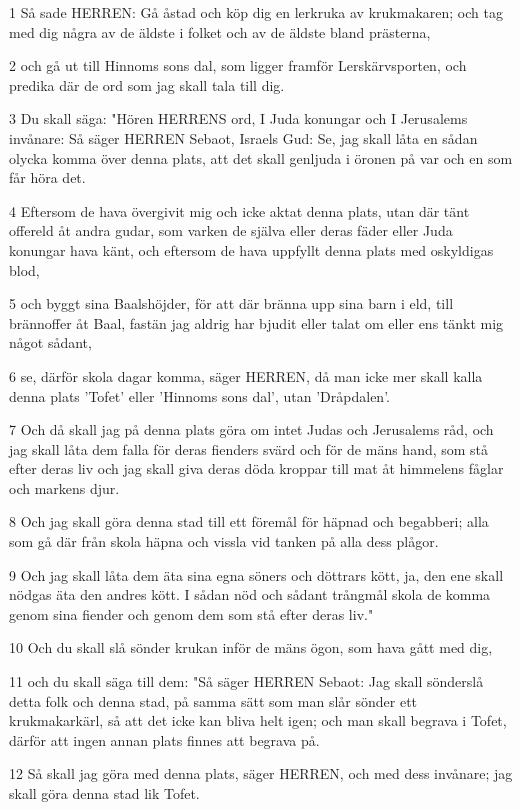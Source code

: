 \par 1 Så sade HERREN: Gå åstad och köp dig en lerkruka av krukmakaren; och tag med dig några av de äldste i folket och av de äldste bland prästerna,
\par 2 och gå ut till Hinnoms sons dal, som ligger framför Lerskärvsporten, och predika där de ord som jag skall tala till dig.
\par 3 Du skall säga: "Hören HERRENS ord, I Juda konungar och I Jerusalems invånare: Så säger HERREN Sebaot, Israels Gud: Se, jag skall låta en sådan olycka komma över denna plats, att det skall genljuda i öronen på var och en som får höra det.
\par 4 Eftersom de hava övergivit mig och icke aktat denna plats, utan där tänt offereld åt andra gudar, som varken de själva eller deras fäder eller Juda konungar hava känt, och eftersom de hava uppfyllt denna plats med oskyldigas blod,
\par 5 och byggt sina Baalshöjder, för att där bränna upp sina barn i eld, till brännoffer åt Baal, fastän jag aldrig har bjudit eller talat om eller ens tänkt mig något sådant,
\par 6 se, därför skola dagar komma, säger HERREN, då man icke mer skall kalla denna plats 'Tofet' eller 'Hinnoms sons dal', utan 'Dråpdalen'.
\par 7 Och då skall jag på denna plats göra om intet Judas och Jerusalems råd, och jag skall låta dem falla för deras fienders svärd och för de mäns hand, som stå efter deras liv och jag skall giva deras döda kroppar till mat åt himmelens fåglar och markens djur.
\par 8 Och jag skall göra denna stad till ett föremål för häpnad och begabberi; alla som gå där från skola häpna och vissla vid tanken på alla dess plågor.
\par 9 Och jag skall låta dem äta sina egna söners och döttrars kött, ja, den ene skall nödgas äta den andres kött. I sådan nöd och sådant trångmål skola de komma genom sina fiender och genom dem som stå efter deras liv."
\par 10 Och du skall slå sönder krukan inför de mäns ögon, som hava gått med dig,
\par 11 och du skall säga till dem: "Så säger HERREN Sebaot: Jag skall sönderslå detta folk och denna stad, på samma sätt som man slår sönder ett krukmakarkärl, så att det icke kan bliva helt igen; och man skall begrava i Tofet, därför att ingen annan plats finnes att begrava på.
\par 12 Så skall jag göra med denna plats, säger HERREN, och med dess invånare; jag skall göra denna stad lik Tofet.
